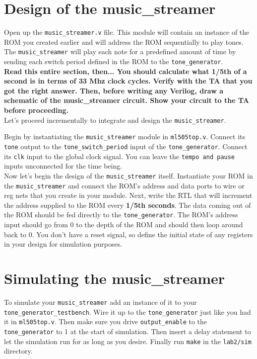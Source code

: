\documentclass[11pt]{article}
\begin{document}
\section{Design of the music\_streamer}
Open up the \verb|music_streamer.v| file. This module will contain an instance of the ROM you created earlier and will address the ROM sequentially to play tones. The \verb|music_streamer| will play each note for a predefined amount of time by sending each switch period defined in the ROM to the \verb|tone_generator|.\\

\textbf{Read this entire section, then... You should calculate what 1/5th of a second is in terms of 33 Mhz clock cycles. Verify with the TA that you got the right answer. Then, before writing any Verilog, draw a schematic of the music\_streamer circuit. Show your circuit to the TA before proceeding.}\\

Let's proceed incrementally to integrate and design the \verb|music_streamer|.

Begin by instantiating the \verb|music_streamer| module in \verb|ml505top.v|. Connect its \verb|tone| output to the \verb|tone_switch_period| input of the \verb|tone_generator|. Connect its \verb|clk| input to the global clock signal. You can leave the \verb|tempo and pause| inputs unconnected for the time being.\\

Now let's begin the design of the \verb|music_streamer| itself. Instantiate your ROM in the \verb|music_streamer| and connect the ROM's address and data ports to wire or reg nets that you create in your module. Next, write the RTL that will increment the address supplied to the ROM every \textbf{1/5th seconds}. The data coming out of the ROM should be fed directly to the \verb|tone_generator|. The ROM's address input should go from 0 to the depth of the ROM and should then loop around back to 0. You don't have a reset signal, so define the initial state of any registers in your design for simulation purposes.

\section{Simulating the music\_streamer}
To simulate your \verb|music_streamer| add an instance of it to your \verb|tone_generator_testbench|. Wire it up to the \verb|tone_generator| just like you had it in \verb|ml505top.v|. Then make sure you drive \verb|output_enable| to the \verb|tone_generator| to 1 at the start of simulation. Then insert a delay statement to let the simulation run for as long as you desire. Finally run \verb|make| in the \verb|lab2/sim| directory.\\
\end{document}
